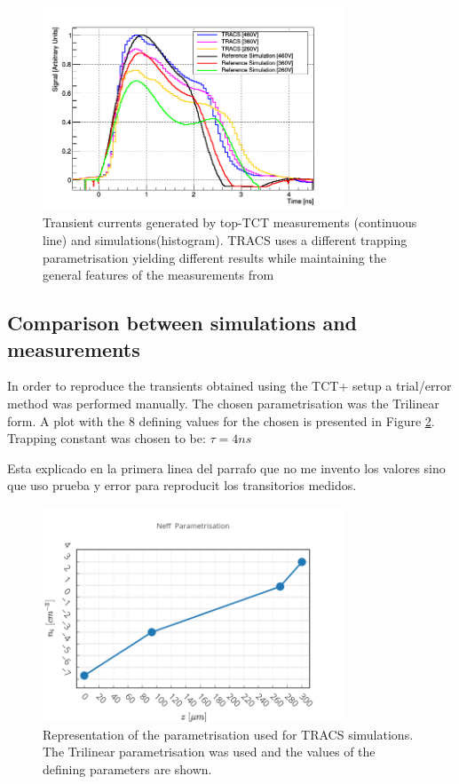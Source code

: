 \begin{figure}[H]
	\centering
	\includegraphics[width=0.8\textwidth]{Pohlsen_scr.png}
	\caption{Transient currents generated by top-TCT measurements (continuous line) and simulations(histogram). TRACS uses a different trapping parametrisation yielding different results while maintaining the general features of the measurements from \cite{Pholsen}}
	\label{fig:PholsenTransient}
\end{figure}


\subsection{Comparison between simulations and measurements}


In order to reproduce the transients obtained using the TCT+ setup a trial/error method was performed manually. The chosen \neff parametrisation was the Trilinear form. A plot with the 8 defining values for the chosen \neff is presented in Figure \ref{fig:TRACSparam}. Trapping constant was chosen to be: $\tau = 4 ns$ 

Esta explicado en la primera linea del parrafo que no me invento los valores sino que uso prueba y error para reproducit los transitorios medidos.

\begin{figure}[H]
	\centering
	\includegraphics[width=0.8\textwidth]{Neff.png}
	\caption{Representation of the \neff parametrisation used for TRACS simulations. The Trilinear parametrisation was used and the values of the defining parameters are shown.}
	\label{fig:TRACSparam}
\end{figure}


